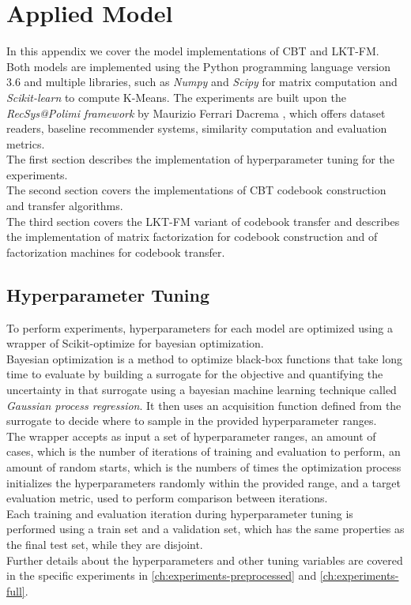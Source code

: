 \chapter{Applied Model}
\label{ch:applied-model}

In this appendix we cover the model implementations of CBT and LKT-FM. Both models are implemented using the Python programming language version 3.6 and multiple libraries, such as \textit{Numpy} \cite{10.1109/MCSE.2011.37} and \textit{Scipy} \cite{scipy} for matrix computation and \textit{Scikit-learn} \cite{10.5555/1953048.2078195} to compute K-Means. The experiments are built upon the \textit{RecSys@Polimi framework} by Maurizio Ferrari Dacrema \cite{recsys-polimi-framework}, which offers dataset readers, baseline recommender systems, similarity computation and evaluation metrics.\\
The first section describes the implementation of hyperparameter tuning for the experiments.\\
The second section covers the implementations of CBT codebook construction and transfer algorithms.\\
The third section covers the LKT-FM variant of codebook transfer and describes the implementation of matrix factorization for codebook construction and of factorization machines for codebook transfer.



\section{Hyperparameter Tuning}

To perform experiments, hyperparameters for each model are optimized using a wrapper of Scikit-optimize \cite{10.5281/zenodo.1170575} for bayesian optimization.\\
Bayesian optimization \cite{bayesian-optimization} is a method to optimize black-box functions that take long time to evaluate by building a surrogate for the objective and quantifying the uncertainty in that surrogate using a bayesian machine learning technique called \textit{Gaussian process regression}. It then uses an acquisition function defined from the surrogate to decide where to sample in the provided hyperparameter ranges.\\
The wrapper accepts as input a set of hyperparameter ranges, an amount of cases, which is the number of iterations of training and evaluation to perform, an amount of random starts, which is the numbers of times the optimization process initializes the hyperparameters randomly within the provided range, and a target evaluation metric, used to perform comparison between iterations.\\
Each training and evaluation iteration during hyperparameter tuning is performed using a train set and a validation set, which has the same properties as the final test set, while they are disjoint.\\
Further details about the hyperparameters and other tuning variables are covered in the specific experiments in \autoref{ch:experiments-preprocessed} and \autoref{ch:experiments-full}.



